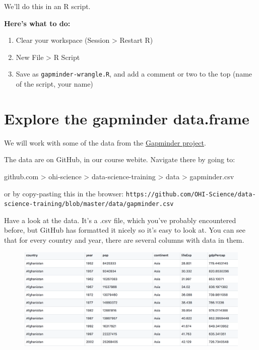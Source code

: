 \documentclass[]{book}
\providecommand{\tightlist}{%
  \setlength{\itemsep}{0pt}\setlength{\parskip}{0pt}}
\theoremstyle{definition}
\theoremstyle{definition}
\theoremstyle{definition}
\theoremstyle{remark}
\begin{document}
We'll do this in an R script.

\textbf{Here's what to do:}

\begin{enumerate}
\def\labelenumi{\arabic{enumi}.}
\tightlist
\item
  Clear your workspace (Session \textgreater{} Restart R)
\item
  New File \textgreater{} R Script
\item
  Save as \texttt{gapminder-wrangle.R}, and add a comment or two to the
  top (name of the script, your name)
\end{enumerate}

\section{Explore the gapminder
data.frame}\label{explore-the-gapminder-data.frame}

We will work with some of the data from the
\href{http://www.gapminder.org}{Gapminder project}.

The data are on GitHub, in our course webite. Navigate there by going
to:

github.com \textgreater{} ohi-science \textgreater{}
data-science-training \textgreater{} data \textgreater{} gapminder.csv

or by copy-pasting this in the browser:
\texttt{https://github.com/OHI-Science/data-science-training/blob/master/data/gapminder.csv}

Have a look at the data. It's a .csv file, which you've probably
encountered before, but GitHub has formatted it nicely so it's easy to
look at. You can see that for every country and year, there are several
columns with data in them.

\begin{figure}[htbp]
\centering
\includegraphics{img/gapminder_gh.png}
\caption{}
\end{figure}
\end{document}
